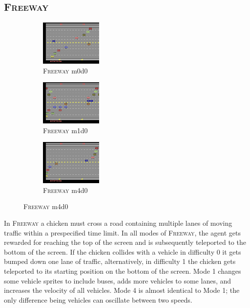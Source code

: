 \documentclass{article}
\begin{document}
\subsection*{\textsc{Freeway}}
\begin{figure}[h]
    \begin{subfigure}{0.32\linewidth}
    \centering
    \includegraphics[width=1.2in]{figures/alemodes/freeway_m0.png}
    \caption{\textsc{Freeway} m0d0}
    \end{subfigure}
    \begin{subfigure}{0.32\linewidth}
    \centering
    \includegraphics[width=1.2in]{figures/alemodes/freeway_m1.png}
    \caption{\textsc{Freeway} m1d0}
    \end{subfigure}
    \begin{subfigure}{0.32\linewidth}
    \centering
    \includegraphics[width=1.2in]{figures/alemodes/freeway_m4.png}
    \caption{\textsc{Freeway} m4d0}
    \end{subfigure}
\end{figure}
In \textsc{Freeway} a chicken must cross a road containing multiple lanes of moving traffic within a prespecified time limit. In all modes of \textsc{Freeway}, the agent gets rewarded for reaching the top of the screen and is subsequently teleported to the bottom of the screen.
If the chicken collides with a vehicle in difficulty 0 it gets bumped down one lane of traffic, alternatively, in difficulty 1 the chicken gets teleported to its starting position on the bottom of the screen.
Mode 1 changes some vehicle sprites to include buses, adds more vehicles to some lanes, and increases the velocity of all vehicles.
Mode 4 is almost identical to Mode 1; the only difference being vehicles can oscillate between two speeds.
\end{document}
